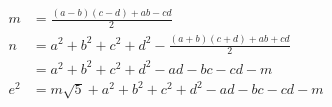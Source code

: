 \begin{align*}
m   &= \frac{(a - b)(c - d) + ab - cd}{2} \\
n   &= a^2 + b^2 + c^2 + d^2 - \frac{(a + b)(c + d) + ab + cd}{2} \\
    &=  a^2 + b^2 + c^2 + d^2 - ad - bc - cd - m \\
e^2 &= m\sqrt{5} + a^2 + b^2 + c^2 + d^2 - ad - bc - cd - m
\end{align*}